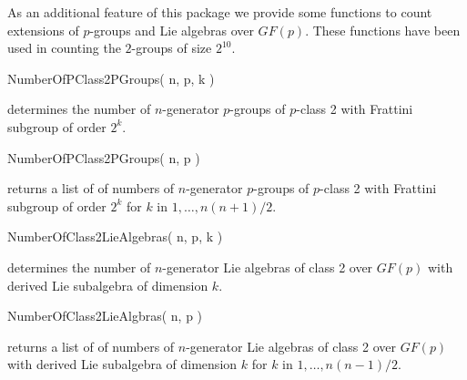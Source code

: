 

As an additional feature of this package we provide some functions to
count extensions of $p$-groups and Lie algebras over $GF(p)$. These
functions have been used in counting the $2$-groups of size $2^{10}$.

\> NumberOfPClass2PGroups( n, p, k )

determines the number of $n$-generator $p$-groups of $p$-class 2 with
Frattini subgroup of order $2^k$. 

\> NumberOfPClass2PGroups( n, p )

returns a list of of numbers of $n$-generator $p$-groups of $p$-class 2
with Frattini subgroup of order $2^k$ for $k$ in $1, \ldots, n(n+1)/2$.

\> NumberOfClass2LieAlgebras( n, p, k )

determines the number of $n$-generator Lie algebras of class 2 over 
$GF(p)$ with derived Lie subalgebra of dimension $k$.

\> NumberOfClass2LieAlgbras( n, p )

returns a list of of numbers of $n$-generator Lie algebras of class 2
over $GF(p)$ with derived Lie subalgebra of dimension $k$ for $k$ in
$1, \ldots, n(n-1)/2$.

